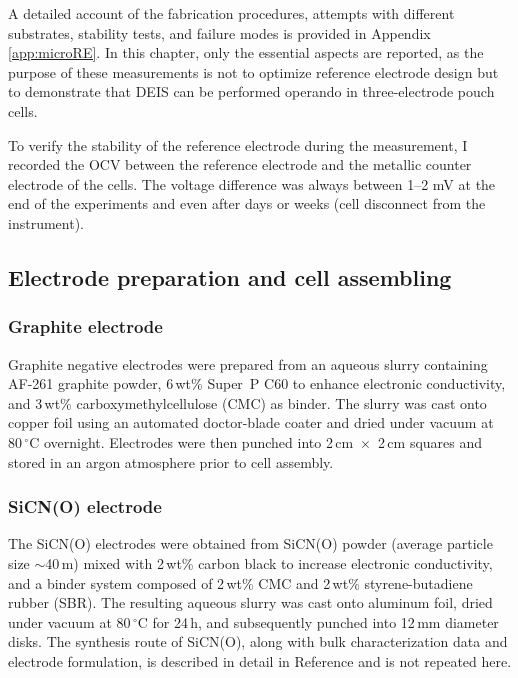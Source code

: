 A detailed account of the fabrication procedures, attempts with different substrates, stability tests, and failure modes is provided in Appendix \ref{app:microRE}.  
In this chapter, only the essential aspects are reported, as the purpose of these measurements is not to optimize reference electrode design but to demonstrate that DEIS can be performed operando in three-electrode pouch cells.

To verify the stability of the reference electrode during the measurement, I recorded the OCV between the reference electrode and the metallic counter electrode of the cells.
The voltage difference was always between 1--2 mV at the end of the experiments and even after days or weeks (cell disconnect from the instrument).

\subsection{Electrode preparation and cell assembling}

\subsubsection{Graphite electrode}
Graphite negative electrodes were prepared from an aqueous slurry containing AF-261 graphite powder, 6\,wt\% Super~P C60 to enhance electronic conductivity, and 3\,wt\% carboxymethylcellulose (CMC) as binder.  
The slurry was cast onto copper foil using an automated doctor-blade coater and dried under vacuum at 80\,$^\circ$C overnight.  
Electrodes were then punched into 2\,cm~$\times$~2\,cm squares and stored in an argon atmosphere prior to cell assembly.

\subsubsection{SiCN(O) electrode}
The SiCN(O) electrodes were obtained from SiCN(O) powder (average particle size $\sim$40\,\textmu m) mixed with 2\,wt\% carbon black to increase electronic conductivity, and a binder system composed of 2\,wt\% CMC and 2\,wt\% styrene-butadiene rubber (SBR).  
The resulting aqueous slurry was cast onto aluminum foil, dried under vacuum at 80\,$^\circ$C for 24\,h, and subsequently punched into 12\,mm diameter disks.  
The synthesis route of SiCN(O), along with bulk characterization data and electrode formulation, is described in detail in Reference \cite{derilReversibleSodiumPlating2023} and is not repeated here.

